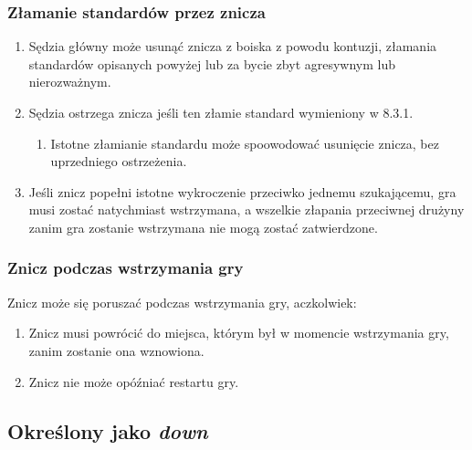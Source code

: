 \documentclass[11pt,a4paper]{article}
\begin{document}
\subsubsection{Złamanie standardów przez znicza}
\begin{enumerate}
  \item Sędzia główny może usunąć znicza z boiska z powodu kontuzji, złamania standardów opisanych powyżej lub za bycie zbyt agresywnym lub nierozważnym.
  \item Sędzia ostrzega znicza jeśli ten złamie standard wymieniony w 8.3.1. %
  \begin{enumerate}
    \item Istotne złamianie standardu może spoowodować usunięcie znicza, bez uprzedniego ostrzeżenia.
  \end{enumerate}
  \item Jeśli znicz popełni istotne wykroczenie przeciwko jednemu szukającemu, gra musi zostać natychmiast wstrzymana, a wszelkie złapania przeciwnej drużyny zanim gra zostanie wstrzymana nie mogą zostać zatwierdzone.
\end{enumerate}

\subsubsection{Znicz podczas wstrzymania gry}
Znicz może się poruszać podczas wstrzymania gry, aczkolwiek:
\begin{enumerate}
  \item Znicz musi powrócić do miejsca, którym był w momencie wstrzymania gry, zanim zostanie ona wznowiona.
  \item Znicz nie może opóźniać restartu gry.
\end{enumerate}

\subsection{Określony jako \emph{down}}
\end{document}
